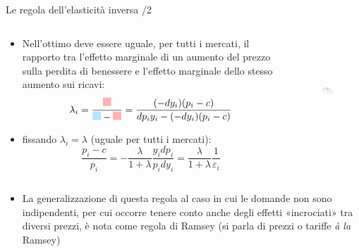\documentclass[aspectratio=64,12pt]{beamer}
\begin{document}
\begin{frame}{Le regola dell'elasticità inversa /2}
\begin{columns}
\begin{column}{.57\columnwidth}
\begin{itemize}
\item Nell'ottimo deve essere uguale, per tutti i mercati, il rapporto tra l'effetto marginale di un aumento del prezzo sulla perdita di benessere e l'effetto marginale dello stesso aumento sui ricavi:
\begin{equation*}
  \lambda_i=
  \frac{\textcolor{red!30!white}{\rule{3mm}{3mm}}}{\textcolor{cyan!30!white}{\rule{3mm}{3mm}}-
        \textcolor{red!30!white}{\rule{3mm}{3mm}}}=
  \frac{(-dy_i)(p_i-c)}{dp_iy_i-(-dy_i)(p_i-c)}
\end{equation*}
\item fissando $\lambda_i=\lambda$ (uguale per tutti i mercati):
\begin{equation*}
   \frac{p_i-c}{p_i} = -\frac{\lambda}{1+\lambda}\frac{y_idp_i}{p_idy_i} = \frac{\lambda}{1+\lambda}\frac{1}{\varepsilon_i} 
\end{equation*}
\end{itemize}
\end{column}

\begin{column}{.43\columnwidth}
\begin{figure}[htbp]
\centering
\includegraphics[height=4cm]{./figure/ramsey-4-color.pdf}
\end{figure}
\end{column}
\end{columns}

\medskip
\begin{itemize}
\item La generalizzazione di questa regola al caso in cui le domande non sono
indipendenti, per cui occorre tenere conto anche degli effetti «incrociati» tra diversi prezzi, è nota come \alert{regola di Ramsey} (si parla di prezzi o tariffe \emph{à la} Ramsey)
\end{itemize}
\end{frame}
\end{document}
